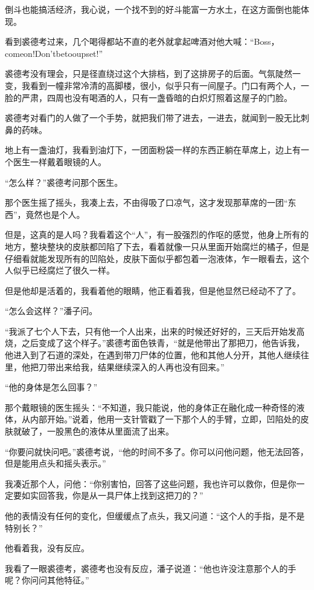倒斗也能搞活经济，我心说，一个找不到的好斗能富一方水土，在这方面倒也能体现。

看到裘德考过来，几个喝得都站不直的老外就拿起啤酒对他大喊：“Boss，comeon!Don'tbetooupset!”

裘德考没有理会，只是径直绕过这个大排档，到了这排房子的后面。气氛陡然一变，我看到一幢非常冷清的高脚楼，很小，似乎只有一间屋子。门口有两个人，一脸的严肃，四周也没有喝酒的人，只有一盏昏暗的白炽灯照着这屋子的门脸。

裘德考对看门的人做了一个手势，就把我们带了进去，一进去，就闻到一股无比刺鼻的药味。

地上有一盏油灯，我看到油灯下，一团面粉袋一样的东西正躺在草席上，边上有一个医生一样戴着眼镜的人。

“怎么样？”裘德考问那个医生。

那个医生摇了摇头，我凑上去，不由得吸了口凉气，这才发现那草席的一团“东西”，竟然也是个人。

但是，这真的是人吗？我看着这个“人”，有一股强烈的作呕的感觉，他身上所有的地方，整块整块的皮肤都凹陷了下去，看着就像一只从里面开始腐烂的橘子，但是仔细看就能发现所有的凹陷处，皮肤下面似乎都包着一泡液体，乍一眼看去，这个人似乎已经腐烂了很久一样。

但是他却是活着的，我看着他的眼睛，他正看着我，但是他显然已经动不了了。

“怎么会这样？”潘子问。

“我派了七个人下去，只有他一个人出来，出来的时候还好好的，三天后开始发高烧，之后变成了这个样子。”裘德考面色铁青，“就是他带出了那把刀，他告诉我，他进入到了石道的深处，在遇到带刀尸体的位置，他和其他人分开，其他人继续往里，他把刀带出来给我，结果继续深入的人再也没有回来。”

“他的身体是怎么回事？”

那个戴眼镜的医生摇头：“不知道，我只能说，他的身体正在融化成一种奇怪的液体，从内部开始。”说着，他用一支针管戳了一下那个人的手臂，立即，凹陷处的皮肤就破了，一股黑色的液体从里面流了出来。

“你要问就快问吧。”裘德考说，“他的时间不多了。你可以问他问题，他无法回答，但是能用点头和摇头表示。”

我凑近那个人，问他：“你别害怕，回答了这些问题，我也许可以救你，但是你一定要如实回答我，你是从一具尸体上找到这把刀的？”

他的表情没有任何的变化，但缓缓点了点头，我又问道：“这个人的手指，是不是特别长？”

他看着我，没有反应。

我看了一眼裘德考，裘德考也没有反应，潘子说道：“他也许没注意那个人的手呢？你问问其他特征。”

